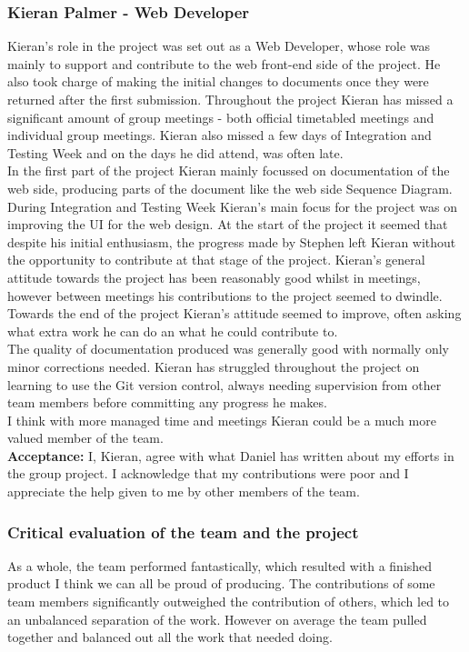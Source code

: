 \documentclass{article}
\begin{document}
		\subsubsection{Kieran Palmer - Web Developer}
		Kieran's role in the project was set out as a Web Developer, whose role was mainly to support and contribute to the web front-end side of the project. He also took charge of making the initial changes to documents once they were returned after the first submission. Throughout the project Kieran has missed a significant amount of group meetings - both official timetabled meetings and individual group meetings. Kieran also missed a few days of Integration and Testing Week and on the days he did attend, was often late. \\
		In the first part of the project Kieran mainly focussed on documentation of the web side, producing parts of the document like the web side Sequence Diagram. During Integration and Testing Week Kieran's main focus for the project was on improving the UI for the web design. At the start of the project it seemed that despite his initial enthusiasm, the progress made by Stephen left Kieran without the opportunity to contribute at that stage of the project. Kieran's general attitude towards the project has been reasonably good whilst in meetings, however between meetings his contributions to the project seemed to dwindle. Towards the end of the project Kieran's attitude seemed to improve, often asking what extra work he can do an what he could contribute to. \\
		
		The quality of documentation produced was generally good with normally only minor corrections needed.	Kieran has struggled throughout the project on learning to use the Git version control, always needing supervision from other team members before committing any progress he makes. \\
		
		I think with more managed time and meetings Kieran could be a much more valued member of the team. \\
		
{\bf Acceptance:} I, Kieran, agree with what Daniel has written about my efforts in the group project. I acknowledge that my contributions were poor and I appreciate the help given to me by other members of the team.


		\subsubsection{Critical evaluation of the team and the project}
		As a whole, the team performed fantastically, which resulted with a finished product I think we can all be proud of producing. The contributions of some team members significantly outweighed the contribution of others, which led to an unbalanced separation of the work. However on average the team pulled together and balanced out all the work that needed doing. \\
\end{document}
